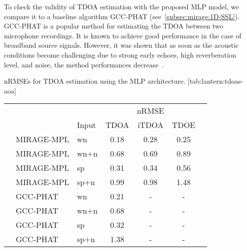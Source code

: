 To check the validity of \ac{TDOA} estimation with the proposed \ac{MLP} model, we compare it to a baseline algorithm \acf{GCC-PHAT} (see~\cref{subsec:mirage:1D-SSL}).
\ac{GCC-PHAT} is a popular method for estimating the \ac{TDOA} between two microphone recordings.
It is known to achieve good performance in the case of broadband source signals.
However, it was shown that as soon as the acoustic conditions become challenging due to strong early echoes, high reverberation level, and noise, the method performances decrease~.

\begin{table}[h]
    \begin{sidecaption}{%
        \acfp{nRMSE} for TDOA estimation using the \ac{MLP} architecture.
    }[tab:lantern:tdoas-aoa]
    \centering
    \footnotesize
    \small
    \begin{tabular*}{\linewidth}{@{\extracolsep{\fill}}lll|cccc@{}}
    \toprule
    &            &         &          & nRMSE           &\\
    &            & Input   &    \ac{TDOA}  	&   \ac{iTDOA} 		 &     \ac{TDOE}   	&\\
    \midrule
    & MIRAGE-MPL      &   wn    & 0.18    & 0.28  & 0.25 	& \\
    & MIRAGE-MPL      &   wn+n  & 0.68    & 0.69  & 0.89 	& \\
    & MIRAGE-MPL      &   sp    & 0.31    & 0.34  & 0.56    & \\
    & MIRAGE-MPL      &   sp+n  & 0.99    & 0.98  & 1.48 	& \\
    & GCC-PHAT    &   wn    & 0.21    & -     & -		& \\
    & GCC-PHAT    &   wn+n  & 0.68    & -     & -		& \\
    & GCC-PHAT    &   sp 	& 0.32    & -     & -		& \\
    & GCC-PHAT    &   sp+n  & 1.38    & -     & -		& \\
    \bottomrule
    \end{tabular*}
    \end{sidecaption}
\end{table}

